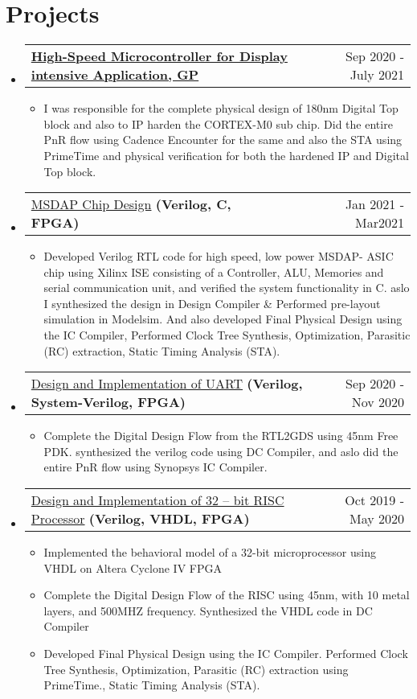 \documentclass[letterpaper,11pt]{article}
\makeatletter
\newcommand{\sectionStart}{
  \begin{itemize}[label={},leftmargin=0in]
}
\newcommand{\sectionEnd}{
  \end{itemize}
}
\newcommand{\projectHeading}[4]{
  \vspace{-1pt}
  \item
  \begin{tabular*}{1.0\textwidth}{l@{\extracolsep{\fill}}r@{}}
    \normalsize{{\href{#1}{#2}} \textbf{#3}} & #4 \\
  \end{tabular*}\vspace{-5pt}
}
\newcommand{\listStart}{\begin{itemize}}
\newcommand{\listEnd}{\end{itemize}\vspace{-5pt}}
\newcommand{\bulletItem}[1]{
  \item
  \small{
    {#1 \vspace{-1.8pt}}
  }
}
\makeatother
\begin{document}
\section{Projects}
\sectionStart
  \projectHeading
    {}
    {\textbf{High-Speed Microcontroller for Display intensive Application, GP}}
    {}
    {Sep 2020 - July 2021}
  \listStart
    \bulletItem
      {I was responsible for the complete physical design of 180nm Digital Top block and also to IP harden the CORTEX-M0
      	sub chip. Did the entire PnR flow using Cadence Encounter for the same and also the STA using PrimeTime and
      	physical verification for both the hardened IP and Digital Top block.}
  \listEnd
  \projectHeading
  {https://github.com/abdelazeem201/Mini-Stereo-Digital-Audio-Processor-MSDAP}
  {MSDAP Chip Design}
  {(Verilog, C, FPGA)}
  {Jan 2021 - Mar2021}
  \listStart
  \bulletItem
  {Developed Verilog RTL code for high speed, low power MSDAP- ASIC chip using Xilinx ISE consisting of a Controller,
  	ALU, Memories and serial communication unit, and verified the system functionality in C. aslo I synthesized the design
  	in Design Compiler \& Performed pre-layout simulation in Modelsim. And also developed Final Physical Design using
  	the IC Compiler, Performed Clock Tree Synthesis, Optimization, Parasitic (RC) extraction, Static Timing Analysis
  	(STA).}
  \listEnd
  \projectHeading
    {https://github.com/abdelazeem201/ASIC-Implementation-UART}
    {Design and Implementation of UART}
    {(Verilog, System-Verilog, FPGA)}
    {Sep 2020 - Nov 2020}
  \listStart
    \bulletItem
      { Complete the Digital Design Flow from the RTL2GDS using 45nm Free PDK. synthesized the verilog code using DC
      	Compiler, and aslo did the entire PnR flow using Synopsys IC Compiler.}
  \listEnd
  \projectHeading
    {https://github.com/abdelazeem201/5-Stage-Pipeline-RISC-V-RV32I}
    {Design and Implementation of 32 – bit RISC Processor}
    {(Verilog, VHDL, FPGA)}
    {Oct 2019 - May 2020}
  \listStart
    \bulletItem
      {Implemented the behavioral model of a 32-bit microprocessor using VHDL on Altera Cyclone IV FPGA}
  \bulletItem
      {Complete the Digital Design Flow of the RISC using 45nm, with 10 metal layers, and 500MHZ frequency. Synthesized
      	the VHDL code in DC Compiler}
        \bulletItem
      {Developed Final Physical Design using the IC Compiler. Performed Clock Tree Synthesis, Optimization, Parasitic (RC)
      	extraction using PrimeTime., Static Timing Analysis (STA).}
  \listEnd
\sectionEnd

\end{document}
